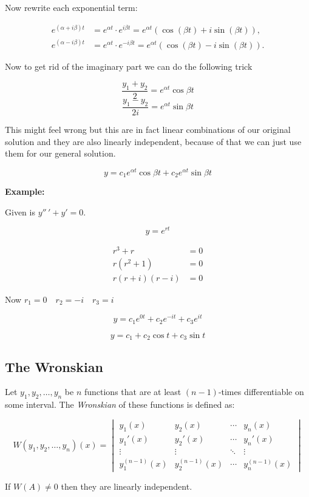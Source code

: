 Now rewrite each exponential term:

\begin{align*}
e^{(\alpha + i\beta)t} &= e^{\alpha t} \cdot e^{i\beta t} = e^{\alpha t} (\cos(\beta t) + i \sin(\beta t)), \\
e^{(\alpha - i\beta)t} &= e^{\alpha t} \cdot e^{-i\beta t} = e^{\alpha t} (\cos(\beta t) - i \sin(\beta t)).
\end{align*}

Now to get rid of the imaginary part we can do the following trick

\[\frac{y_1 + y_2}{2} = e^{\alpha t}\cos\beta t\]
\[\frac{y_1 - y_2}{2i} = e^{\alpha t}\sin\beta t\]

This might feel wrong but this are in fact linear combinations of our original solution
and they are also linearly independent, because of that we can just use them for our general solution.

\[y = c_1 e^{\alpha t}\cos\beta t + c_2  e^{\alpha t}\sin\beta t\]

\textbf{Example:}
\vspace{\baselineskip}

Given is \(y''\,' + y' = 0\).

\[y = e^{rt}\]

\begin{align*}
r^3 + r &= 0\\
r(r^2 + 1) &= 0\\
r(r + i)(r - i) &= 0
\end{align*}

Now \(r_1 = 0 \quad r_2 = -i \quad r_3 = i\)

\[y = c_1 e^{0t} + c_2 e^{-it} + c_3 e^{it}\]

\[y = c_1 + c_2 \cos t + c_3 \sin t\]

\subsection{The Wronskian}

Let \( y_1, y_2, \ldots, y_n \) be \( n \) functions that are at least 
\( (n-1) \)-times differentiable on some interval. The \emph{Wronskian} of these 
functions is defined as:

\[
W(y_1, y_2, \ldots, y_n)(x) =
\begin{vmatrix}
y_1(x) & y_2(x) & \cdots & y_n(x) \\
y_1'(x) & y_2'(x) & \cdots & y_n'(x) \\
\vdots & \vdots & \ddots & \vdots \\
y_1^{(n-1)}(x) & y_2^{(n-1)}(x) & \cdots & y_n^{(n-1)}(x)
\end{vmatrix}
\]

If \(W(A) \ne 0\) then they are linearly independent.





